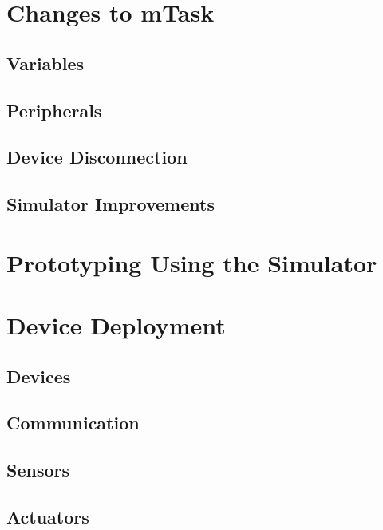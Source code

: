 
\section{Changes to mTask}
\subsection{Variables}
\subsection{Peripherals}
\subsection{Device Disconnection}
\subsection{Simulator Improvements}

\section{Prototyping Using the Simulator}

\section{Device Deployment}
\subsection{Devices}
\subsection{Communication}
\subsection{Sensors}
\subsection{Actuators}
